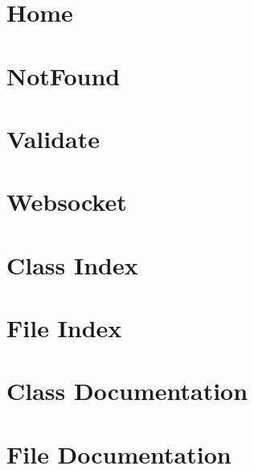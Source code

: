 \documentclass[twoside]{book}
\newcommand{\+}{\discretionary{\mbox{\scriptsize$\hookleftarrow$}}{}{}}
\newcommand{\clearemptydoublepage}{%
    \newpage{\pagestyle{empty}\cleardoublepage}%
  }
\begin{document}
\chapter{Home}
\label{md_src_routes_Home}

\chapter{Not\+Found}
\label{md_src_routes_NotFound}

\chapter{Validate}
\label{md_src_routes_Validate}

\chapter{Websocket}
\label{md_src_routes_Websocket}

\chapter{Class Index}

\chapter{File Index}

\chapter{Class Documentation}


\chapter{File Documentation}



































  \backmatter
  \newpage
  \clearemptydoublepage
  \printindex
\end{document}
